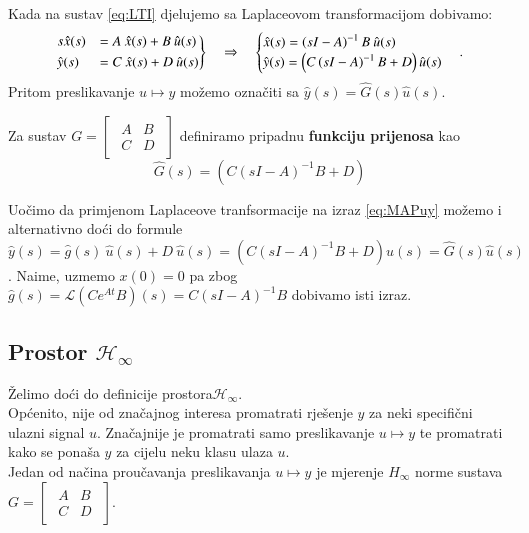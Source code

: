 \begin{exa}
    Kada na sustav \eqref{eq:LTI} djelujemo sa Laplaceovom transformacijom dobivamo:
    \begin{equation*}
        \begin{rcases}
            s \hat{x}(s) &= A\:\hat{x}(s) + B \: \hat{u}(s)\\
            \hat{y}(s) &= C\:\hat{x}(s) + D\:\hat{u}(s)
        \end{rcases}
        \quad \Rightarrow \quad
        \begin{cases}
            \hat{x}(s) = \left(sI - A\right)^{-1}B\:\hat{u}(s)\\
            \hat{y}(s) = \left(C\left(sI - A\right)^{-1}B + D\right)\hat{u}(s)
        \end{cases}.
    \end{equation*}
        Pritom preslikavanje $u \mapsto y $ možemo označiti sa $\hat{y}(s) = \hat{G}(s)\hat{u}(s)$.
\end{exa}
\begin{defn}
    Za sustav $G = \begin{bmatrix}
        \begin{array}{c|c}
           A & B \\
          \hline
          C & D
        \end{array}
    \end{bmatrix}$
    definiramo pripadnu \textbf{funkciju prijenosa} kao
    \begin{equation}
        \hat{G}(s) = \left(C\left(sI - A\right)^{-1}B + D\right)
    \end{equation}
\end{defn}
\begin{rem}
    Uočimo da primjenom Laplaceove tranfsormacije na izraz \eqref{eq:MAPuy} možemo i alternativno doći do formule $\hat{y}(s) = \hat{g}(s) \: \hat{u}(s) + D\:\hat{u}(s)= \left(C\left(sI - A\right)^{-1}B + D\right)\hat{u}(s) = \hat{G}(s)\hat{u}(s)$. Naime, uzmemo $x(0) = 0$ pa zbog $\hat{g}(s) = \mathcal{L}(C e^{At}B)(s) = C\left(sI - A\right)^{-1}B$ dobivamo isti izraz.
\end{rem}

\subsection{Prostor $\mathcal{H}_\infty$}
Želimo doći do definicije prostora$\mathcal{H}_\infty$.\\
Općenito, nije od značajnog interesa promatrati rješenje $y$ za neki specifični ulazni signal $u$. Značajnije je promatrati samo preslikavanje $u \mapsto y$ te promatrati kako se ponaša $y$ za cijelu neku klasu ulaza $u$.\\
Jedan od načina proučavanja preslikavanja $u \mapsto y$ je mjerenje $H_\infty$ norme sustava $G = \begin{bmatrix}
        \begin{array}{c|c}
           A & B \\
          \hline
          C & D
        \end{array}
    \end{bmatrix}$.

